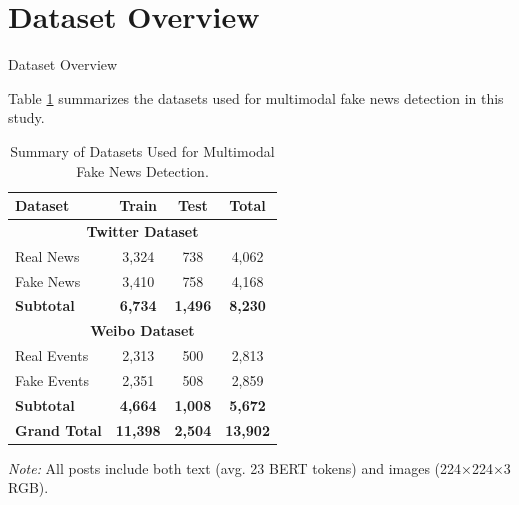 \documentclass[xcolor=dvipsnames,aspectratio=169]{beamer}
\begin{document}
\section{Dataset Overview}
\begin{frame}{Dataset Overview}

Table \ref{tab:dataset_summary} summarizes the datasets used for multimodal fake news detection in this study.

\begin{table}[!ht]
    \caption{Summary of Datasets Used for Multimodal Fake News Detection.}
    \centering
    \small
    \begin{tabular}{|l|c|c|c|}
        \hline
        \textbf{Dataset} & \textbf{Train} & \textbf{Test} & \textbf{Total} \\
        \hline
        \multicolumn{4}{|c|}{\textbf{Twitter Dataset}} \\
        \hline
        Real News & 3,324 & 738 & 4,062 \\
        Fake News & 3,410 & 758 & 4,168 \\
        \textbf{Subtotal} & \textbf{6,734} & \textbf{1,496} & \textbf{8,230} \\
        \hline
        \multicolumn{4}{|c|}{\textbf{Weibo Dataset}} \\
        \hline
        Real Events & 2,313 & 500 & 2,813 \\
        Fake Events & 2,351 & 508 & 2,859 \\
        \textbf{Subtotal} & \textbf{4,664} & \textbf{1,008} & \textbf{5,672} \\
        \hline
        \hline
        \textbf{Grand Total} & \textbf{11,398} & \textbf{2,504} & \textbf{13,902} \\
        \hline
    \end{tabular}
    \vspace{0.2cm}
    
    \footnotesize
    \textit{Note:} All posts include both text (avg. 23 BERT tokens) and images (224×224×3 RGB).
    \label{tab:dataset_summary}
\end{table}

\end{frame}



\end{document}
